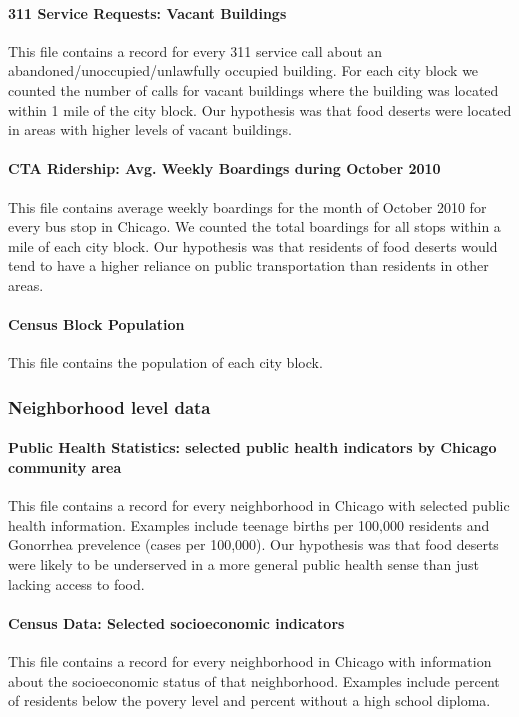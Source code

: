 \documentclass{IEEEtran}
\begin{document}
\paragraph{ 311 Service Requests: Vacant Buildings}
This file contains a record for every 311 service call about an abandoned/unoccupied/unlawfully occupied building. For each city block we counted the number of calls for vacant buildings where the building was located within 1 mile of the city block. Our hypothesis was that food deserts were located in areas with higher levels of vacant buildings. 

\paragraph{ CTA Ridership: Avg. Weekly Boardings during October 2010}
This file contains average weekly boardings for the month of October 2010 for every bus stop in Chicago. We counted the total boardings for all stops within a mile of each city block. Our hypothesis was that residents of food deserts would tend to have a higher reliance on public transportation than residents in other areas. 

\paragraph{ Census Block Population  }
This file contains the population of each city block. 

\subsubsection{Neighborhood level data}

\paragraph{ Public Health Statistics: selected public health indicators by Chicago community area}
This file contains a record for every neighborhood in Chicago with selected public health information. Examples include teenage births per 100,000 residents and Gonorrhea prevelence (cases per 100,000). Our hypothesis was that food deserts were likely to be underserved in a more general public health sense than just lacking access to food. 

\paragraph{ Census Data: Selected socioeconomic indicators    }
This file contains a record for every neighborhood in Chicago with information about the socioeconomic status of that neighborhood. Examples include percent of residents below the povery level and percent without a high school diploma. 
\end{document}
